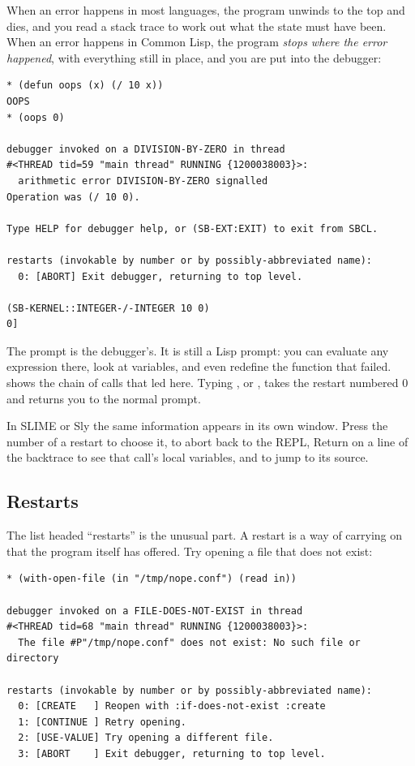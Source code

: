 When an error happens in most languages, the program unwinds to the
top and dies, and you read a stack trace to work out what the state
must have been. When an error happens in Common Lisp, the program
\emph{stops where the error happened}, with everything still in place,
and you are put into the debugger:

\begin{verbatim}
* (defun oops (x) (/ 10 x))
OOPS
* (oops 0)

debugger invoked on a DIVISION-BY-ZERO in thread
#<THREAD tid=59 "main thread" RUNNING {1200038003}>:
  arithmetic error DIVISION-BY-ZERO signalled
Operation was (/ 10 0).

Type HELP for debugger help, or (SB-EXT:EXIT) to exit from SBCL.

restarts (invokable by number or by possibly-abbreviated name):
  0: [ABORT] Exit debugger, returning to top level.

(SB-KERNEL::INTEGER-/-INTEGER 10 0)
0]
\end{verbatim}

The prompt \code{0]} is the debugger's. It is still a Lisp prompt:
you can evaluate any expression there, look at variables, and even
redefine the function that failed.  shows the chain
of calls that led here. Typing , or , takes the
restart numbered 0 and returns you to the normal prompt.

In SLIME or Sly the same information appears in its own window. Press
the number of a restart to choose it,  to abort back to the
REPL, Return on a line of the backtrace to see that call's local
variables, and  to jump to its source.

\subsection{Restarts}

The list headed ``restarts'' is the unusual part. A restart is a
way of carrying on that the program itself has offered. Try opening
a file that does not exist:

\begin{verbatim}
* (with-open-file (in "/tmp/nope.conf") (read in))

debugger invoked on a FILE-DOES-NOT-EXIST in thread
#<THREAD tid=68 "main thread" RUNNING {1200038003}>:
  The file #P"/tmp/nope.conf" does not exist: No such file or directory

restarts (invokable by number or by possibly-abbreviated name):
  0: [CREATE   ] Reopen with :if-does-not-exist :create
  1: [CONTINUE ] Retry opening.
  2: [USE-VALUE] Try opening a different file.
  3: [ABORT    ] Exit debugger, returning to top level.
\end{verbatim}

